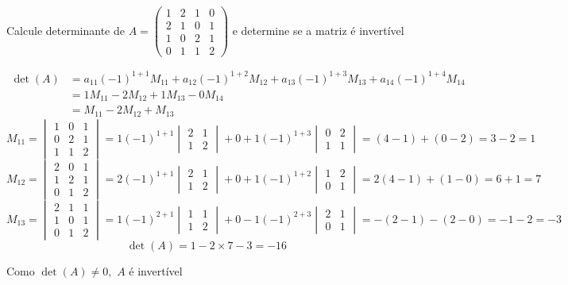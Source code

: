 \documentclass[a4paper,12pt,fleqn]{article}
\begin{document}

Calcule determinante de
\(
  A =
  \begin{pmatrix}
    1 & 2 & 1 & 0 \\
    2 & 1 & 0 & 1 \\
    1 & 0 & 2 & 1 \\
    0 & 1 & 1 & 2
  \end{pmatrix}
\)
e determine se a matriz é invertível

\begin{answer}
\begin{align*}
  \det(A)
  & = a_{11}(-1)^{1+1} M_{11}
    + a_{12}(-1)^{1+2} M_{12}
    + a_{13}(-1)^{1+3} M_{13}
    + a_{14}(-1)^{1+4} M_{14} \\
  & = 1 M_{11} - 2 M_{12} + 1 M_{13} - 0 M_{14}   \\
  & = M_{11} - 2 M_{12} + M_{13}
\end{align*}
\[
  M_{11}
  = \begin{vmatrix}
      1 & 0 & 1 \\
      0 & 2 & 1 \\
      1 & 1 & 2
    \end{vmatrix}
  = 1 (-1)^{1+1}
    \begin{vmatrix}
      2 & 1 \\
      1 & 2
    \end{vmatrix}
    + 0
    + 1 (-1)^{1+3}
    \begin{vmatrix}
      0 & 2 \\
      1 & 1
    \end{vmatrix}
  = (4-1)+(0-2)
  = 3 - 2
  = 1
\]
\[
  M_{12}
  = \begin{vmatrix}
    2 & 0 & 1 \\
    1 & 2 & 1 \\
    0 & 1 & 2
  \end{vmatrix}
  = 2  (-1)^{1+1}
  \begin{vmatrix}
    2 & 1 \\
    1 & 2
  \end{vmatrix}
  + 0
  + 1 (-1)^{1+2}
  \begin{vmatrix}
    1 & 2 \\
    0 & 1
  \end{vmatrix}
  = 2(4-1)+(1-0)
  = 6 + 1
  = 7
\]
\[
  M_{13}
  = \begin{vmatrix}
    2 & 1 & 1 \\
    1 & 0 & 1 \\
    0 & 1 & 2
  \end{vmatrix}
  = 1 (-1)^{2+1}
  \begin{vmatrix}
    1 & 1 \\
    1 & 2
  \end{vmatrix}
  + 0
  - 1 (-1)^{2+3}
  \begin{vmatrix}
    2 & 1 \\
    0 & 1
  \end{vmatrix}
  = -(2-1) - (2-0)
  = -1 - 2
  = -3
\]
\[
  \det(A) = 1 -2 \times 7 -3 = -16
\]

Como
\(
  \det(A) \neq 0,
\)
$A$ é invertível
\end{answer}
\end{document}
